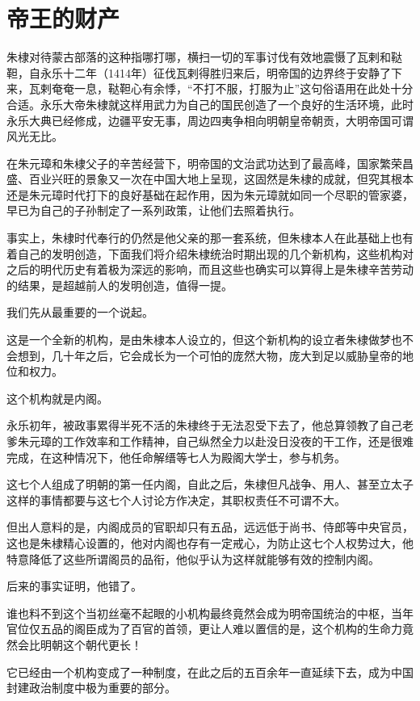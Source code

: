 \section{帝王的财产}
\ifnum{}
	\begin{multicols}{\theparacolNo}
\fi
朱棣对待蒙古部落的这种指哪打哪，横扫一切的军事讨伐有效地震慑了瓦剌和鞑靼，自永乐十二年（1414年）征伐瓦剌得胜归来后，明帝国的边界终于安静了下来，瓦剌奄奄一息，鞑靼心有余悸，“不打不服，打服为止”这句俗语用在此处十分合适。永乐大帝朱棣就这样用武力为自己的国民创造了一个良好的生活环境，此时永乐大典已经修成，边疆平安无事，周边四夷争相向明朝皇帝朝贡，大明帝国可谓风光无比。

在朱元璋和朱棣父子的辛苦经营下，明帝国的文治武功达到了最高峰，国家繁荣昌盛、百业兴旺的景象又一次在中国大地上呈现，这固然是朱棣的成就，但究其根本还是朱元璋时代打下的良好基础在起作用，因为朱元璋就如同一个尽职的管家婆，早已为自己的子孙制定了一系列政策，让他们去照着执行。

事实上，朱棣时代奉行的仍然是他父亲的那一套系统，但朱棣本人在此基础上也有着自己的发明创造，下面我们将介绍朱棣统治时期出现的几个新机构，这些机构对之后的明代历史有着极为深远的影响，而且这些也确实可以算得上是朱棣辛苦劳动的结果，是超越前人的发明创造，值得一提。

我们先从最重要的一个说起。

这是一个全新的机构，是由朱棣本人设立的，但这个新机构的设立者朱棣做梦也不会想到，几十年之后，它会成长为一个可怕的庞然大物，庞大到足以威胁皇帝的地位和权力。

这个机构就是内阁。

永乐初年，被政事累得半死不活的朱棣终于无法忍受下去了，他总算领教了自己老爹朱元璋的工作效率和工作精神，自己纵然全力以赴没日没夜的干工作，还是很难完成，在这种情况下，他任命解缙等七人为殿阁大学士，参与机务。

这七个人组成了明朝的第一任内阁，自此之后，朱棣但凡战争、用人、甚至立太子这样的事情都要与这七个人讨论方作决定，其职权责任不可谓不大。

但出人意料的是，内阁成员的官职却只有五品，远远低于尚书、侍郎等中央官员，这也是朱棣精心设置的，他对内阁也存有一定戒心，为防止这七个人权势过大，他特意降低了这些所谓阁员的品衔，他似乎认为这样就能够有效的控制内阁。

后来的事实证明，他错了。

谁也料不到这个当初丝毫不起眼的小机构最终竟然会成为明帝国统治的中枢，当年官位仅五品的阁臣成为了百官的首领，更让人难以置信的是，这个机构的生命力竟然会比明朝这个朝代更长！

它已经由一个机构变成了一种制度，在此之后的五百余年一直延续下去，成为中国封建政治制度中极为重要的部分。


\end{multicols}
